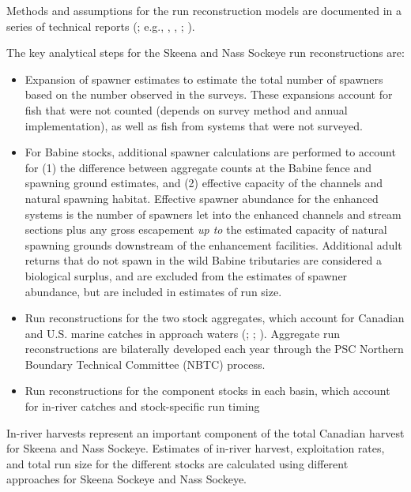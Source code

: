 \documentclass[french,11pt]{book}
\begin{document}
Methods and assumptions for the run reconstruction models are documented in a series of technical reports (; e.g., , , ; ).

The key analytical steps for the Skeena and Nass Sockeye run reconstructions are:
\begin{itemize}

\item
  Expansion of spawner estimates to estimate the total number of spawners based on the number observed in the surveys. These expansions account for fish that were not counted (depends on survey method and annual implementation), as well as fish from systems that were not surveyed.
\item
  For Babine stocks, additional spawner calculations are performed to account for (1) the difference between aggregate counts at the Babine fence and spawning ground estimates, and (2) effective capacity of the channels and natural spawning habitat. Effective spawner abundance for the enhanced systems is the number of spawners let into the enhanced channels and stream sections plus any gross escapement \emph{up to} the estimated capacity of natural spawning grounds downstream of the enhancement facilities. Additional adult returns that do not spawn in the wild Babine tributaries are considered a biological surplus, and are excluded from the estimates of spawner abundance, but are included in estimates of run size.
\item
  Run reconstructions for the two stock aggregates, which account for Canadian and U.S. marine catches in approach waters (; ; ). Aggregate run reconstructions are bilaterally developed each year through the PSC Northern Boundary Technical Committee (NBTC) process.
\item
  Run reconstructions for the component stocks in each basin, which account for in-river catches and stock-specific run timing
\end{itemize}
In-river harvests represent an important component of the total Canadian harvest for Skeena and Nass Sockeye. Estimates of in-river harvest, exploitation rates, and total run size for the different stocks are calculated using different approaches for Skeena Sockeye and Nass Sockeye.
\end{document}
